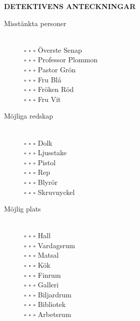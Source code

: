\documentclass[a5paper,10pt]{article}
\begin{document}
\pagestyle{empty}

\newenvironment{categories} {
\newcommand{\cat}[1]{ \item[ {\large ##1} ] }
\newcommand{\sub}[1]{ \hfill \\ {\small $\square$ $\square$ $\square$ ##1} }
    \begin{framed}
    \textbf{DETEKTIVENS ANTECKNINGAR}
    \begin{description}
}{
    \end{description}
    \end{framed}
}


\begin{categories}
\cat{Misstänkta personer}
\sub{Överste Senap}
\sub{Professor Plommon}
\sub{Pastor Grön}
\sub{Fru Blå}
\sub{Fröken Röd}
\sub{Fru Vit}

\cat{Möjliga redskap}
\sub{Dolk}
\sub{Ljusstake}
\sub{Pistol}
\sub{Rep}
\sub{Blyrör}
\sub{Skruvnyckel}

\cat{Möjlig plats}
\sub{Hall}
\sub{Vardagsrum}
\sub{Matsal}
\sub{Kök}
\sub{Finrum}
\sub{Galleri}
\sub{Biljardrum}
\sub{Bibliotek}
\sub{Arbetsrum}
\end{categories}
\end{document}
